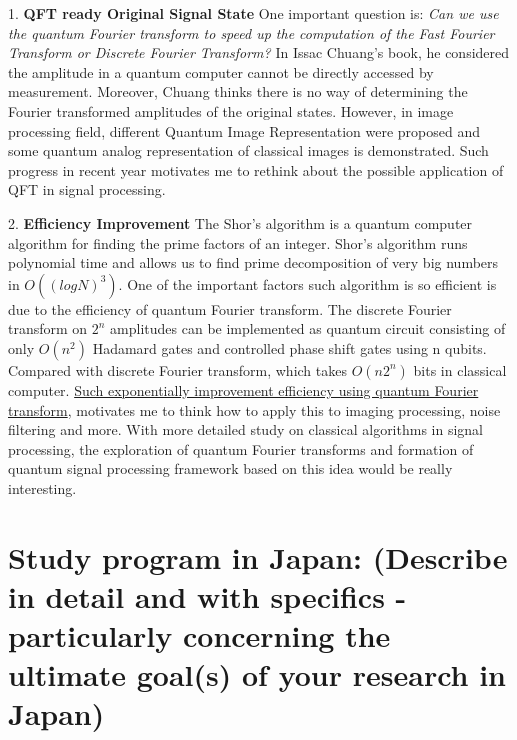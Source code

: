 \documentclass{article}
\begin{document}
1. \textbf{QFT ready Original Signal State } One important question is:
\textit{
Can we use the quantum Fourier transform to speed up the 
computation of the Fast Fourier Transform or Discrete Fourier Transform?} 
In Issac Chuang's book, he considered the amplitude in a quantum 
computer cannot be directly accessed by measurement. Moreover, Chuang 
thinks there is no way of determining the Fourier transformed 
amplitudes of the original states. However, in image processing field, 
different Quantum Image Representation were proposed and some quantum analog 
representation of classical images is demonstrated. Such progress in recent 
year motivates me to rethink about the possible application of QFT in 
signal processing.   \newline

2. \textbf{Efficiency Improvement} The Shor's algorithm is a 
quantum computer algorithm for finding the prime factors of an integer. 
Shor's algorithm runs polynomial time and allows us to find prime decomposition of very big 
numbers in $O ((log N)^3)$. One of the important factors such algorithm is so efficient is 
due to the efficiency of quantum Fourier transform. The discrete Fourier transform on 
$2^n$ amplitudes can be implemented as quantum circuit consisting of only $O(n^2)$ Hadamard gates
and controlled phase shift gates using n qubits. Compared with discrete Fourier transform, 
which takes $O(n 2^n )$ bits in classical computer. \underline{Such exponentially improvement 
efficiency using quantum Fourier transform}, motivates me to think how to apply this 
to imaging processing, noise filtering and more. With more detailed study on 
classical algorithms in signal processing, the exploration of quantum 
Fourier transforms and formation of quantum signal processing framework based on 
this idea would be really interesting. 

\section{Study program in Japan:
(Describe in detail and with specifics - particularly
concerning the ultimate goal(s) of your research in Japan)
}
\end{document}
